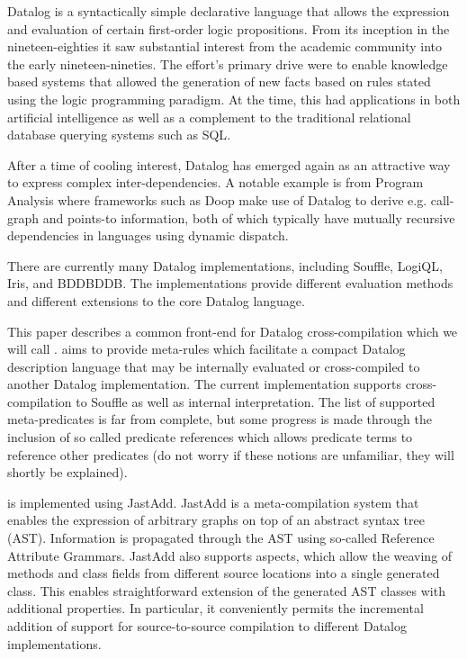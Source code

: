 Datalog is a syntactically simple declarative language that allows the expression and evaluation of certain first-order logic propositions. From its inception in the nineteen-eighties it saw substantial interest from the academic community into the early nineteen-nineties\cite{Green:2013:DRQ:2688167.2688168}. The effort's primary drive were to enable knowledge based systems that allowed the generation of new facts based on rules stated using the logic programming paradigm. At the time, this had applications in both artificial intelligence as well as a complement to the traditional relational database querying systems such as SQL\cite{Ceri:1989:YAW:627272.627357}\cite{Bancilhon:1986:AIR:16894.16859}.

After a time of cooling interest, Datalog has emerged again as an attractive way to express complex inter-dependencies\cite{Green:2013:DRQ:2688167.2688168}. A notable example is from Program Analysis where frameworks such as Doop\cite{Smaragdakis:2010:UDF:2185923.2185939} make use of Datalog to derive e.g. call-graph and points-to information, both of which typically have mutually recursive dependencies in languages using dynamic dispatch. 

There are currently many Datalog implementations, including Souffle\cite{Scholz:2016:FLP:2892208.2892226}, LogiQL\cite{Aref:2015:DIL:2723372.2742796}, Iris\cite{Bishop_iris-integrated}, and BDDBDDB\cite{Whaley:2005:UDB:2099708.2099719}. The implementations provide different evaluation methods and different extensions to the core Datalog language. 

This paper describes a common front-end for Datalog cross-compilation which we will call \datalogM. \datalogM aims to provide meta-rules which facilitate a compact Datalog description language that may be internally evaluated or cross-compiled to another Datalog implementation. The current implementation supports cross-compilation to Souffle as well as internal interpretation. The list of supported meta-predicates is far from complete, but some progress is made through the inclusion of so called predicate references which allows predicate terms to reference other predicates (do not worry if these notions are unfamiliar, they will shortly be explained).

\datalogM is implemented using JastAdd\cite{Ekman:2007:JEJ:1297105.1297029}. JastAdd is a meta-compilation system that enables the expression of arbitrary graphs on top of an abstract syntax tree (AST). Information is propagated through the AST using so-called Reference Attribute Grammars\cite{Ekman:2007:JEJ:1297105.1297029}. JastAdd also supports aspects, which allow the weaving of methods and class fields from different source locations into a single generated class. This enables straightforward extension of the generated AST classes with additional properties. In particular, it conveniently permits the incremental addition of support for source-to-source compilation to different Datalog implementations. 

